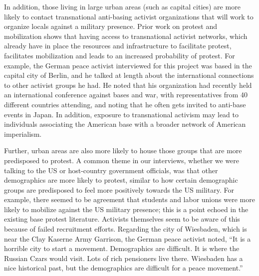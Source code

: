 		In addition, those living in large urban areas (such as capital cities) are more likely to contact transnational anti-basing activist organizations that will work to organize locals against a military presence.\cite{Murdie2011,Murdie2015,Kiyani2020} Prior work on protest and mobilization shows that having access to transnational activist networks, which already have in place the resources and infrastructure to facilitate protest, facilitates mobilization and leads to an increased probability of protest. For example, the German peace activist interviewed for this project was based in the capital city of Berlin, and he talked at length about the international connections to other activist groups he had. He noted that his organization had recently held an international conference against bases and war, with representatives from 40 different countries attending, and noting that he often gets invited to anti-base events in Japan.\cite[][He also highlighted the importance to mobilization of having an activism infrastructure in place, noting that the German peace movement has a very good peace infrastructure.]{berlinone20190723} In addition, exposure to transnational activism may lead to individuals associating the American base with a broader network of American imperialism.\cite{Immerwahr2019}  
		
		Further, urban areas are also more likely to house those groups that are more predisposed to protest. A common theme in our interviews, whether we were talking to the US or host-country government officials, was that other demographics are more likely to protest, similar to how certain demographic groups are predisposed to feel more positively towards the US military. For example, there seemed to be agreement that students and labor unions were more likely to mobilize against the US military presence; this is a point echoed in the existing base protest literature.\cite{Fitz2015,embone20180712,berlinone20190723,journ20180712,journ20180713,Allen2020} Activists themselves seem to be aware of this because of failed recruitment efforts. Regarding the city of Wiesbaden, which is near the Clay Kaserne Army Garrison, the German peace activist noted, ``It is a horrible city to start a movement. Demographics are difficult. It is where the Russian Czars would visit. Lots of rich pensioners live there. Wiesbaden has a nice historical past, but the demographics are difficult for a peace movement.''\cite{berlinone20190723}
		
